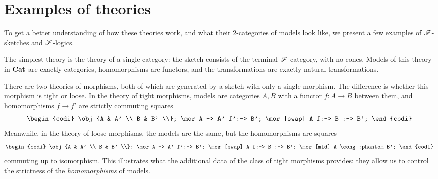 \documentclass[../thesis.tex]{subfiles}
\begin{document}
  \section{Examples of theories}
  To get a better understanding of how these theories work, and what their 2-categories of models look like,
  we present a few examples of ${\mathscr{F}}$-sketches and ${\mathscr{F}}$-logics.

  \begin{example}
    The simplest theory is the theory of a single category: the sketch consists of the terminal
    ${\mathscr{F}}$-category, with no cones. Models of this theory in ${\mathbf{Cat}}$ are exactly categories,
    homomorphisms are functors, and the transformations are exactly natural transformations.
  \end{example}

  \begin{example}
    There are two theories of morphisms, both of which are generated by a sketch with only a single morphism.
    The difference is whether this morphism is tight or loose. In the theory of tight morphisms, models are
    categories $A,B$ with a functor $f : A \to B$ between them, and homomorphisms $f \to f'$ are strictly
    commuting squares
    \[\begin{codi}
      \obj {A & A' \\ B & B' \\};
      \mor A -> A' f':-> B';
      \mor[swap] A f:-> B :-> B';
    \end{codi}\]
    Meanwhile, in the theory of loose morphisms, the models are the same, but the homomorphisms are squares 
    \[\begin{codi}
      \obj {A & A' \\ B & B' \\};
      \mor A -> A' f':-> B';
      \mor[swap] A f:-> B :-> B';
      \mor[mid] A \cong:phantom B';
    \end{codi}\]
    commuting up to isomorphism. This illustrates what the additional data of the class of tight morphisms
    provides: they allow us to control the strictness of the \emph{homomorphisms} of models.
  \end{example}
\end{document}

